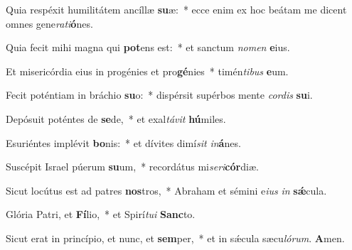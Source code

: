 \item Quia respéxit humilitátem ancíllæ \textbf{su}æ:~* ecce enim ex hoc beátam me dicent omnes gene\textit{rati}\textbf{ó}nes.

\item Quia fecit mihi magna qui \textbf{pot}ens est:~* et sanctum \textit{nomen} \textbf{e}ius.

\item Et misericórdia eius in progénies et pro\textbf{gé}nies~* timén\textit{tibus} \textbf{e}um.

\item Fecit poténtiam in bráchio \textbf{su}o:~* dispérsit supérbos mente \textit{cordis} \textbf{su}i.

\item Depósuit poténtes de \textbf{se}de,~* et exal\textit{távit} \textbf{hú}miles.

\item Esuriéntes implévit \textbf{bo}nis:~* et dívites dimí\textit{sit} \textit{in}\textbf{á}nes.

\item Suscépit Israel púerum \textbf{su}um,~* recordátus mi\textit{seri}\textbf{cór}diæ.

\item Sicut locútus est ad patres \textbf{nos}tros,~* Abraham et sémini e\textit{ius} \textit{in} \textbf{sǽ}cula.

\item Glória Patri, et \textbf{Fí}lio,~* et Spirí\textit{tui} \textbf{Sanc}to.

\item Sicut erat in princípio, et nunc, et \textbf{sem}per,~* et in sǽcula sæcu\textit{lórum}. \textbf{A}men.